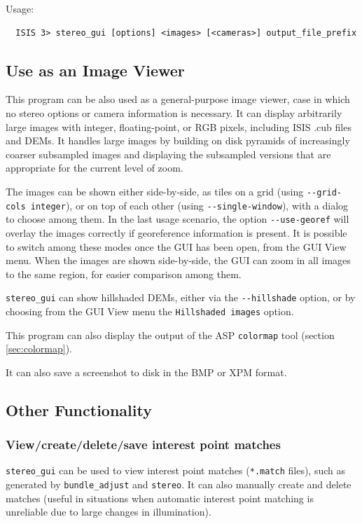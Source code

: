 Usage:
\begin{verbatim}
  ISIS 3> stereo_gui [options] <images> [<cameras>] output_file_prefix
\end{verbatim}

\subsection{Use as an Image Viewer}

This program can be also used as a general-purpose image viewer, case in
which no stereo options or camera information is necessary.  It can
display arbitrarily large images with integer, floating-point, or RGB
pixels, including ISIS .cub files and DEMs. It handles large images by
building on disk pyramids of increasingly coarser subsampled images and
displaying the subsampled versions that are appropriate for the current
level of zoom.

The images can be shown either side-by-side, as tiles on a grid (using
\texttt{-\/-grid-cols integer}), or on top of each other (using
\texttt{-\/-single-window}), with a dialog to choose among them.  In the
last usage scenario, the option \texttt{-\/-use-georef} will overlay the
images correctly if georeference information is present.  It is possible
to switch among these modes once the GUI has been open, from the GUI
View menu. When the images are shown side-by-side, the GUI can zoom
in all images to the same region, for easier comparison among them.

\texttt{stereo\_gui} can show hillshaded DEMs, either via the
\texttt{-\/-hillshade} option, or by choosing from the GUI View menu the
\texttt{Hillshaded images} option.

This program can also display the output of the ASP \texttt{colormap}
tool (section \ref{sec:colormap}).

It can also save a screenshot to disk in the BMP or XPM format. 

\subsection{Other Functionality}

\subsubsection{View/create/delete/save interest point matches}

\texttt{stereo\_gui} can be used to view interest point matches
(\texttt{*.match} files), such as generated by \texttt{bundle\_adjust}
and \texttt{stereo}. It can also manually create and delete
matches (useful in situations when automatic interest point matching is
unreliable due to large changes in illumination).

